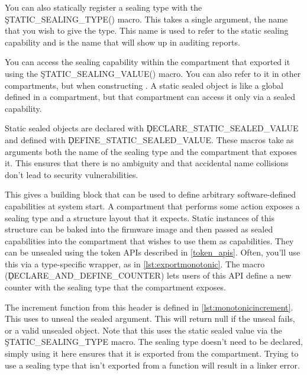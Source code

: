 You can also statically register a sealing type with the \c{STATIC_SEALING_TYPE()} macro.
This takes a single argument, the name that you wish to give the type.
This name is used to refer to the static sealing capability and is the name that will show up in auditing reports.


You can access the sealing capability within the compartment that exported it using the \c{STATIC_SEALING_VALUE()} macro.
You can also refer to it in other compartments, but  when constructing .
A static sealed object is like a global defined in a compartment, but that compartment can access it only via a sealed capability.

Static sealed objects are declared with \c{DECLARE_STATIC_SEALED_VALUE} and defined with \c{DEFINE_STATIC_SEALED_VALUE}.
These macros take as arguments both the name of the sealing type and the compartment that exposes it.
This ensures that there is no ambiguity and that accidental name collisions don't lead to security vulnerabilities.


This gives a building block that can be used to define arbitrary software-defined capabilities at system start.
A compartment that performs some action exposes a sealing type and a structure layout that it expects.
Static instances of this structure can be baked into the firmware image and then passed as sealed capabilities into the compartment that wishes to use them as capabilities.
They can be unsealed using the token APIs described in \ref{token_apis}.
Often, you'll use this via a type-specific wrapper, as in \ref{lst:exportmonotonic}.
The macro (\c{DECLARE_AND_DEFINE_COUNTER}) lets users of this API define a new counter with the sealing type that the compartment exposes.

\codelisting[filename=examples/software_capability/monotonic_counter.hh,marker=export,label=lst:exportmonotonic,caption="A header defining an interface using sealed objects."]{}

The increment function from this header is defined in \ref{lst:monotonicincrement}.
This uses  to unseal the sealed argument.
This will return null if the unseal fails, or a valid unsealed object.
Note that this uses the static sealed value via the \c{STATIC_SEALING_TYPE} macro.
The sealing type doesn't need to be declared, simply using it here ensures that it is exported from the compartment.
Trying to use a sealing type that isn't exported from a function will result in a linker error.

